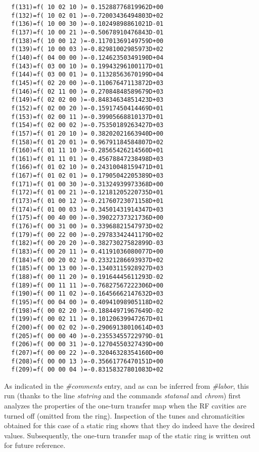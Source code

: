 {\begin{verbatim}
  f(131)=f( 10 02 10 )= 0.15288776819962D+00
  f(132)=f( 10 02 01 )=-0.72003436494803D+02
  f(136)=f( 10 00 30 )=-0.10249898861021D-01
  f(137)=f( 10 00 21 )=-0.50678910476843D-01
  f(138)=f( 10 00 12 )=-0.11701369149759D+00
  f(139)=f( 10 00 03 )=-0.82981002985973D+02
  f(140)=f( 04 00 00 )=-0.12462350349190D+04
  f(143)=f( 03 00 10 )= 0.19943296100117D+01
  f(144)=f( 03 00 01 )= 0.11328563670199D+04
  f(145)=f( 02 20 00 )=-0.11067647113872D+03
  f(146)=f( 02 11 00 )= 0.27084848589679D+03
  f(149)=f( 02 02 00 )=-0.84834634851423D+03
  f(152)=f( 02 00 20 )=-0.15917450414469D+01
  f(153)=f( 02 00 11 )=-0.39905668810137D+01
  f(154)=f( 02 00 02 )=-0.75350189263427D+03
  f(157)=f( 01 20 10 )= 0.38202021663940D+00
  f(158)=f( 01 20 01 )= 0.96791184584807D+02
  f(160)=f( 01 11 10 )=-0.28565426214560D+01
  f(161)=f( 01 11 01 )= 0.45678847238498D+03
  f(166)=f( 01 02 10 )= 0.24310048159471D+01
  f(167)=f( 01 02 01 )= 0.17905042205389D+03
  f(171)=f( 01 00 30 )=-0.31324939973368D+00
  f(172)=f( 01 00 21 )=-0.12181205220735D+01
  f(173)=f( 01 00 12 )=-0.21760723071158D+01
  f(174)=f( 01 00 03 )= 0.34501431914347D+03
  f(175)=f( 00 40 00 )=-0.39022737321736D+00
  f(176)=f( 00 31 00 )= 0.33968821547973D+02
  f(179)=f( 00 22 00 )=-0.29783342441179D+02
  f(182)=f( 00 20 20 )=-0.38273027582899D-03
  f(183)=f( 00 20 11 )= 0.41191036080077D+00
  f(184)=f( 00 20 02 )= 0.23321286693937D+02
  f(185)=f( 00 13 00 )=-0.13403115928927D+03
  f(188)=f( 00 11 20 )= 0.19164445611293D-02
  f(189)=f( 00 11 11 )=-0.76827567222306D+00
  f(190)=f( 00 11 02 )=-0.16456662147632D+03
  f(195)=f( 00 04 00 )= 0.40941098905118D+02
  f(198)=f( 00 02 20 )=-0.18844971967649D-02
  f(199)=f( 00 02 11 )= 0.10120639947267D+01
  f(200)=f( 00 02 02 )=-0.29069138010614D+03
  f(205)=f( 00 00 40 )=-0.23553455722979D-01
  f(206)=f( 00 00 31 )=-0.12704550327439D+00
  f(207)=f( 00 00 22 )=-0.32046328354160D+00
  f(208)=f( 00 00 13 )=-0.35661776470151D+00
  f(209)=f( 00 00 04 )=-0.83158327801083D+02
\end{verbatim}}

     As indicated in the {\em \#comments} entry, and as can be inferred from
{\em \#labor}, this \Mary run (thanks to the line {\em statring } and the commands
{\em statanal } and {\em chrom}\/) first analyzes the properties of the one-turn transfer
map when the RF cavities are turned off (omitted from the ring).
Inspection of the tunes and chromaticities obtained for this case of a
static ring shows that they do indeed have the desired values.
Subsequently, the one-turn transfer map of the static ring is written out
for future reference.

